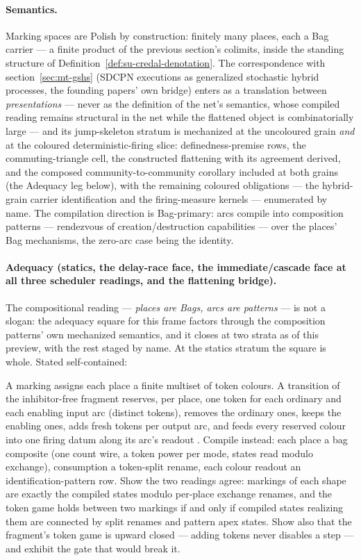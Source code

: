 \paragraph{Semantics.} Marking spaces are Polish by construction:
finitely many places, each a Bag carrier --- a finite product of the
previous section's colimits, inside the standing structure of
Definition~\ref{def:su-credal-denotation}. The correspondence with
section~\ref{sec:mt-gshs} (SDCPN executions as generalized
stochastic hybrid processes, the founding papers' own bridge) enters
as a translation between \emph{presentations} --- never as the
definition of the net's semantics, whose compiled reading remains
structural in the net while the flattened object is combinatorially
large --- and its jump-skeleton stratum is mechanized at the
uncoloured grain \emph{and} at the coloured deterministic-firing
slice: definedness-premise rows, the commuting-triangle cell, the
constructed flattening with its agreement derived, and the composed
community-to-community corollary included at both grains
(the Adequacy leg below), with the remaining coloured obligations ---
the hybrid-grain carrier identification and the firing-measure
kernels --- enumerated by name. The compilation
direction is Bag-primary: arcs compile into composition patterns ---
rendezvous of creation/destruction capabilities --- over the places'
Bag mechanisms, the zero-arc case being the identity.

\paragraph{Adequacy (statics, the delay-race face, the
immediate/cascade face at all three scheduler readings, and the
flattening bridge).} The
compositional reading --- \emph{places are Bags, arcs are patterns}
--- is not a slogan: the adequacy square for this frame factors
through the composition patterns' own mechanized semantics, and it
closes at two strata as of this preview, with the rest staged by
name.  At the statics stratum the square is whole.  Stated
self-contained:

\begin{problem}
\label{prob:mt-sdcpn}
A marking assigns each place a finite multiset of
token colours.  A transition of the inhibitor-free fragment reserves,
per place, one token for each ordinary and each enabling input arc
(distinct tokens), removes the ordinary ones, keeps the enabling ones,
adds fresh tokens per output arc, and feeds every reserved colour into
one firing datum along its arc's readout \cite{everdij-blom-2010}.
Compile instead: each place a bag composite (one count wire, a token
power per mode, states read modulo exchange), consumption a
token-split rename, each colour readout an identification-pattern
row.  Show the two readings agree: markings of each shape are exactly
the compiled states modulo per-place exchange renames, and the token
game holds between two markings if and only if compiled states
realizing them are connected by split renames and pattern apex states.
Show also that the fragment's token game is upward closed --- adding
tokens never disables a step --- and exhibit the gate that would
break it.
\end{problem}

